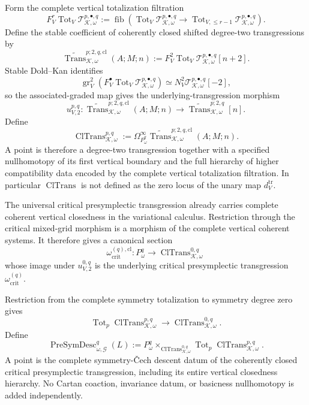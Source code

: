 \begin{construction}
Form the complete vertical totalization filtration
\[
F_V^r\operatorname{Tot}_V
\mathscr T_{\mathcal K,\omega}^{p,\bullet,q}
:=
\operatorname{fib}
\left(
\operatorname{Tot}_V\mathscr T_{\mathcal K,\omega}^{p,\bullet,q}
\longrightarrow
\operatorname{Tot}_{V,\le r-1}
\mathscr T_{\mathcal K,\omega}^{p,\bullet,q}
\right).
\]
Define the stable coefficient of coherently closed shifted degree-two
transgressions by
\[
\boxed{
\widetilde{\operatorname{Trans}}_{\mathcal K,\omega}^{p;2,q,\mathrm{cl}}(A;M;n)
:=
F_V^2\operatorname{Tot}_V
\mathscr T_{\mathcal K,\omega}^{p,\bullet,q}[n+2].
}
\]
Stable Dold--Kan identifies
\[
\operatorname{gr}_V^2
\left(
F_V^\bullet\operatorname{Tot}_V
\mathscr T_{\mathcal K,\omega}^{p,\bullet,q}
\right)
\simeq
N_V^2\mathscr T_{\mathcal K,\omega}^{p,\bullet,q}[-2],
\]
so the associated-graded map gives the underlying-transgression morphism
\[
\boxed{
u_{V,2}^{p,q}:
\widetilde{\operatorname{Trans}}_{\mathcal K,\omega}^{p;2,q,\mathrm{cl}}(A;M;n)
\longrightarrow
\widetilde{\operatorname{Trans}}_{\mathcal K,\omega}^{p;2,q}[n].
}
\]
Define
\[
\boxed{
\operatorname{ClTrans}_{\mathcal K,\omega}^{p,q}
:=
\Omega_{P_\omega^q}^\infty
\widetilde{\operatorname{Trans}}_{\mathcal K,\omega}^{p;2,q,\mathrm{cl}}(A;M;n).
}
\]
A point is therefore a degree-two transgression together with a specified
nullhomotopy of its first vertical boundary and the full hierarchy of higher
compatibility data encoded by the complete vertical totalization filtration.  In
particular $\operatorname{ClTrans}$ is not defined as the zero locus of the unary
map $d_V^{\mathrm{tr}}$.

The universal critical presymplectic transgression already carries complete
coherent vertical closedness in the variational calculus.  Restriction through the
critical mixed-grid morphism is a morphism of the complete vertical coherent
systems.  It therefore gives a canonical section
\[
\boxed{
\omega_{\mathrm{crit}}^{(q),\mathrm{cl}}:
P_\omega^q
\longrightarrow
\operatorname{ClTrans}_{\mathcal K,\omega}^{0,q}
}
\]
whose image under $u_{V,2}^{0,q}$ is the underlying critical presymplectic
transgression $\omega_{\mathrm{crit}}^{(q)}$.
\end{construction}

\begin{definition}
\label{def:symmetry-noether-complete-presymplectic-descent-realization}
Restriction from the complete symmetry totalization to symmetry degree zero gives
\[
\operatorname{Tot}_p
\operatorname{ClTrans}_{\mathcal K,\omega}^{p,q}
\longrightarrow
\operatorname{ClTrans}_{\mathcal K,\omega}^{0,q}.
\]
Define
\[
\boxed{
\operatorname{PreSymDesc}_{\omega,\mathcal G}^{q}(L)
:=
P_\omega^q
\times_{\operatorname{ClTrans}_{\mathcal K,\omega}^{0,q}}
\operatorname{Tot}_p
\operatorname{ClTrans}_{\mathcal K,\omega}^{p,q}.
}
\]
A point is the complete symmetry-\v{C}ech descent datum of the coherently closed
critical presymplectic transgression, including its entire vertical closedness
hierarchy.  No Cartan coaction, invariance datum, or basicness nullhomotopy is added
independently.
\end{definition}

